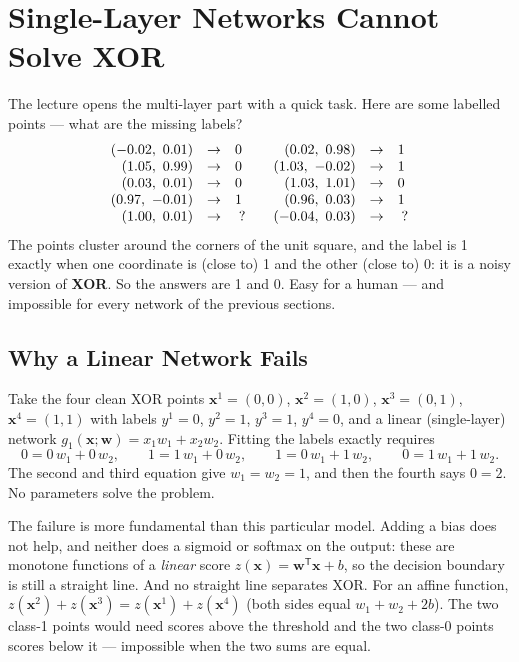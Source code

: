 \documentclass[11pt, oneside]{book}
\newcommand{\T}{^{\mathsf{T}}}           %
\newcommand{\bx}{\bm{x}}        \newcommand{\by}{\bm{y}}
\newcommand{\bw}{\bm{w}}        \newcommand{\bW}{\bm{W}}
\let\originalsection\section
\renewcommand{\section}{\Needspace{7\baselineskip}\originalsection}
\let\originalsubsection\subsection
\renewcommand{\subsection}{\Needspace{6\baselineskip}\originalsubsection}
\begin{document}
\section{Single-Layer Networks Cannot Solve XOR}
\label{sec:xor}

The lecture opens the multi-layer part with a quick task. Here are some
labelled points --- what are the missing labels?
\[
\begin{array}{rcl@{\qquad}rcl}
(-0.02,\ 0.01) &\to& 0 & (0.02,\ 0.98) &\to& 1 \\
(1.05,\ 0.99)  &\to& 0 & (1.03,\ -0.02) &\to& 1 \\
(0.03,\ 0.01)  &\to& 0 & (1.03,\ 1.01) &\to& 0 \\
(0.97,\ -0.01) &\to& 1 & (0.96,\ 0.03) &\to& 1 \\
(1.00,\ 0.01)  &\to& \;? & (-0.04,\ 0.03) &\to& \;?
\end{array}
\]
The points cluster around the corners of the unit square, and the label is
1 exactly when one coordinate is (close to) 1 and the other (close to) 0: it
is a noisy version of \textbf{XOR}. So the answers are 1 and 0. Easy for a
human --- and impossible for every network of the previous sections.

\subsection{Why a Linear Network Fails}

Take the four clean XOR points
$\bx^1 = (0,0)$, $\bx^2 = (1,0)$, $\bx^3 = (0,1)$, $\bx^4 = (1,1)$ with labels
$y^1 = 0$, $y^2 = 1$, $y^3 = 1$, $y^4 = 0$, and a linear (single-layer)
network $g_1(\bx; \bw) = x_1 w_1 + x_2 w_2$. Fitting the labels exactly
requires
\[
  0 = 0\,w_1 + 0\,w_2, \qquad 1 = 1\,w_1 + 0\,w_2, \qquad
  1 = 0\,w_1 + 1\,w_2, \qquad 0 = 1\,w_1 + 1\,w_2 .
\]
The second and third equation give $w_1 = w_2 = 1$, and then the fourth
says $0 = 2$. No parameters solve the problem.

The failure is more fundamental than this particular model. Adding a bias
does not help, and neither does a sigmoid or softmax on the output: these
are monotone functions of a \emph{linear} score $z(\bx) = \bw\T\bx + b$, so
the decision boundary is still a straight line. And no straight line
separates XOR. For an affine function,
$z(\bx^2) + z(\bx^3) = z(\bx^1) + z(\bx^4)$ (both sides equal
$w_1 + w_2 + 2b$). The two class-1 points would need scores above the
threshold and the two class-0 points scores below it --- impossible when
the two sums are equal.
\end{document}
